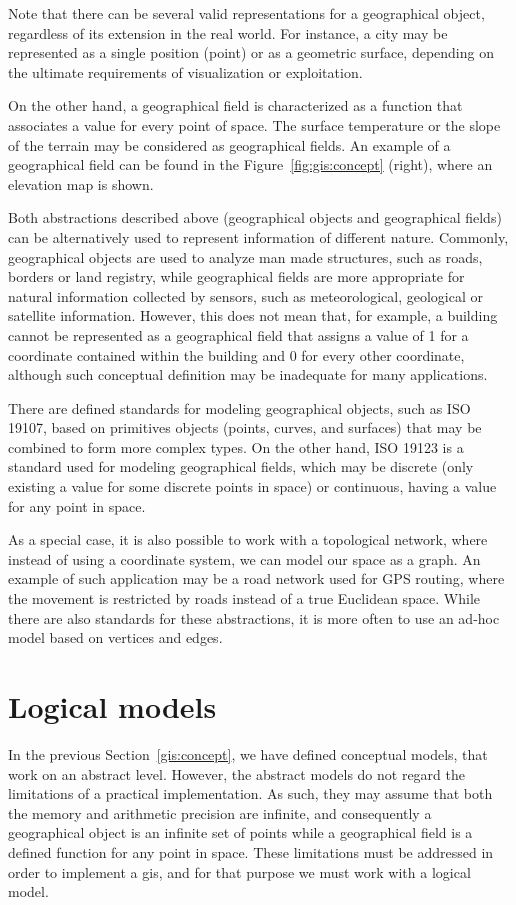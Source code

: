     Note that there can be several valid representations for a geographical object, regardless of its extension in the real world. For instance, a city may be represented as a single position (point) or as a geometric surface, depending on the ultimate requirements of visualization or exploitation.
    
    On the other hand, a geographical field is characterized as a function that associates a value for every point of space. The surface temperature or the slope of the terrain may be considered as geographical fields. An example of a geographical field can be found in the Figure~\ref{fig:gis:concept} (right), where an elevation map is shown.
    
    Both abstractions described above (geographical objects and geographical fields) can be alternatively used to represent information of different nature. Commonly, geographical objects are used to analyze man made structures, such as roads, borders or land registry, while geographical fields are more appropriate for natural information collected by sensors, such as meteorological, geological or satellite information. However, this does not mean that, for example, a building cannot be represented as a geographical field that assigns a value of 1 for a coordinate contained within the building and 0 for every other coordinate, although such conceptual definition may be inadequate for many applications.

    There are defined standards for modeling geographical objects, such as ISO 19107, based on primitives objects (points, curves, and surfaces) that may be combined to form more complex types. On the other hand, ISO 19123 is a standard used for modeling geographical fields, which may be discrete (only existing a value for some discrete points in space) or continuous, having a value for any point in space.
    
    As a special case, it is also possible to work with a topological network, where instead of using a coordinate system, we can model our space as a graph. An example of such application may be a road network used for GPS routing, where the movement is restricted by roads instead of a true Euclidean space. While there are also standards for these abstractions, it is more often to use an ad-hoc model based on vertices and edges.
    
    \section{Logical models}
    In the previous Section~\ref{gis:concept}, we have defined conceptual models, that work on an abstract level. However, the abstract models do not regard the limitations of a practical implementation. As such, they may assume that both the memory and arithmetic precision are infinite, and consequently a geographical object is an infinite set of points while a geographical field is a defined function for any point in space. These limitations must be addressed in order to implement a \gls{gis}, and for that purpose we must work with a logical model.
    
